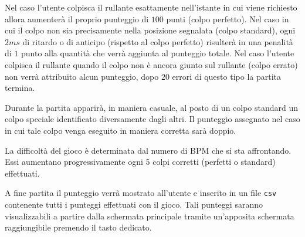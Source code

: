 Nel caso l'utente colpisca il rullante esattamente nell'istante in cui viene richiesto allora aumenterà il proprio punteggio di $100$ punti (colpo perfetto).
Nel caso in cui il colpo non sia precisamente nella posizione segnalata (colpo standard), ogni $2 ms$ di ritardo o di anticipo (rispetto al colpo perfetto) risulterà in una penalità di $1$ punto alla quantità che verrà aggiunta al punteggio totale.
Nel caso l'utente colpisca il rullante quando il colpo non è ancora giunto sul rullante (colpo errato) non verrà attribuito alcun punteggio, dopo $20$ errori di questo tipo la partita termina.

Durante la partita apparirà, in maniera casuale, al posto di un colpo standard un colpo speciale identificato diversamente dagli altri. Il punteggio assegnato nel caso in cui tale colpo venga eseguito in maniera corretta sarà doppio.

La difficoltà del gioco è determinata dal numero di BPM che si sta affrontando. Essi aumentano progressivamente ogni 5 colpi corretti (perfetti o standard) effettuati.

A fine partita il punteggio verrà mostrato all'utente e inserito in un file \texttt{csv} contenente tutti i punteggi effettuati con il gioco. Tali punteggi saranno visualizzabili a partire dalla schermata principale tramite un'apposita schermata raggiungibile premendo il tasto dedicato.